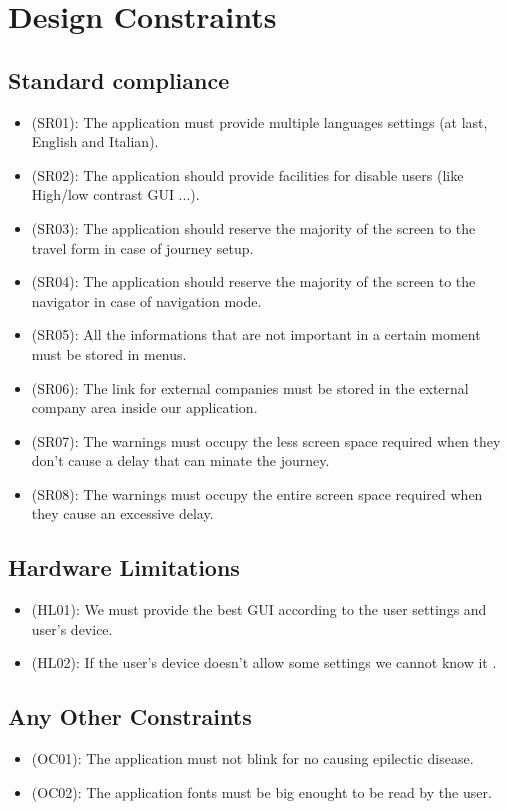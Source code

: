 \documentclass[a4paper]{book}
\begin{document}
\section{Design Constraints}
\subsection{Standard compliance}
\begin{itemize}
\item (SR01): The application must provide multiple languages settings (at last, English and Italian).
\item (SR02): The application should provide facilities for disable users (like High/low contrast GUI ...).
\item (SR03): The application should reserve the majority of the screen to the travel form in case of journey setup.
\item (SR04): The application should reserve the majority of the screen to the navigator in case of navigation mode.
\item (SR05): All the informations that are not important in a certain moment must be stored in menus.
\item (SR06): The link for external companies must be stored in the external company area inside our application.
\item (SR07): The warnings must occupy the less screen space required when they don't cause a delay that can minate the journey.
\item (SR08): The warnings must occupy the entire screen space required when they cause an excessive delay.
\end{itemize}
\subsection{Hardware Limitations}
\begin{itemize}
\item (HL01): We must provide the best GUI according to the user settings and user's device.
\item (HL02): If the user's device doesn't allow some settings we cannot know it .
\end{itemize}
\subsection{Any Other Constraints}
\begin{itemize}
\item (OC01): The application must not blink for no causing epilectic disease.
\item (OC02): The application fonts must be big enought to be read by the user.
\end{itemize}
\end{document}

